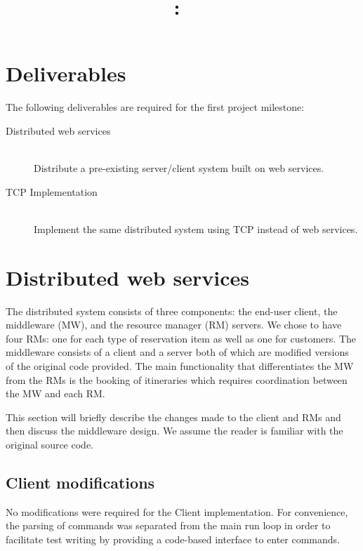 \documentclass{article}
\title{
\vspace{2in}
\textmd{\textbf{\hmwkClass:\ \hmwkTitle}}\\
\vspace{3in}
}
\author{\textbf{\hmwkAuthorName}}
\date{} %
\begin{document}
\maketitle
\thispagestyle{empty}
\newpage
\setcounter{page}{1}

\section{Deliverables}
The following deliverables are required for the first project milestone:
\begin{description}
\item[Distributed web services] \hfill \\ Distribute a pre-existing
server/client system built on web services.
\item[TCP Implementation] \hfill \\ Implement the same distributed system using
TCP instead of web services.
\end{description}


\section{Distributed web services}

The distributed system consists of three components: the end-user client, the middleware (MW), and the resource manager (RM) servers. 
We chose to have four RMs: one for each type of reservation item as well as one for customers. 
The middleware consists of a client and a server both of which are modified versions of the original code provided. 
The main functionality that differentiates the MW from the RMs is the booking of itineraries which requires coordination between the MW and each RM. 


This section will briefly describe the changes made to the client and RMs and then discuss the middleware design. We assume the reader is familiar with the original source code.

\subsection{Client modifications}
No modifications were required for the Client implementation. 
For convenience, the parsing of commands was separated from the main run loop in order to facilitate test writing by providing a code-based interface to enter commands.
	
\end{document}
